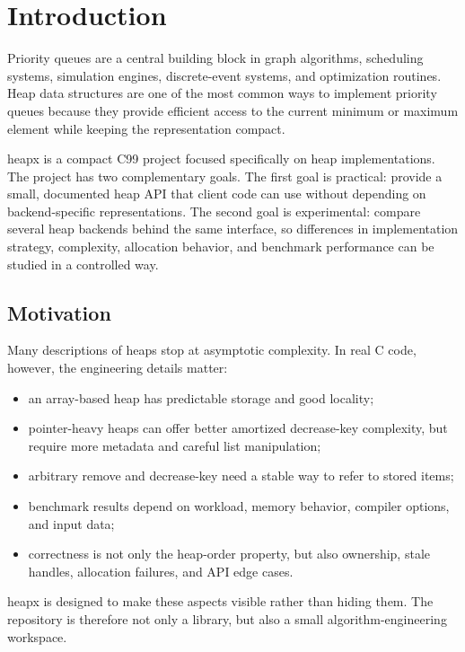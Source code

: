 \chapter{Introduction}

Priority queues are a central building block in graph algorithms, scheduling systems, simulation engines, discrete-event systems, and optimization routines.
Heap data structures are one of the most common ways to implement priority queues because they provide efficient access to the current minimum or maximum element while keeping the representation compact.

heapx is a compact C99 project focused specifically on heap implementations.
The project has two complementary goals.
The first goal is practical: provide a small, documented heap API that client code can use without depending on backend-specific representations.
The second goal is experimental: compare several heap backends behind the same interface, so differences in implementation strategy, complexity, allocation behavior, and benchmark performance can be studied in a controlled way.

\section{Motivation}

Many descriptions of heaps stop at asymptotic complexity.
In real C code, however, the engineering details matter:

\begin{itemize}
    \item an array-based heap has predictable storage and good locality;
    \item pointer-heavy heaps can offer better amortized decrease-key complexity, but require more metadata and careful list manipulation;
    \item arbitrary remove and decrease-key need a stable way to refer to stored items;
    \item benchmark results depend on workload, memory behavior, compiler options, and input data;
    \item correctness is not only the heap-order property, but also ownership, stale handles, allocation failures, and API edge cases.
\end{itemize}

heapx is designed to make these aspects visible rather than hiding them.
The repository is therefore not only a library, but also a small algorithm-engineering workspace.


